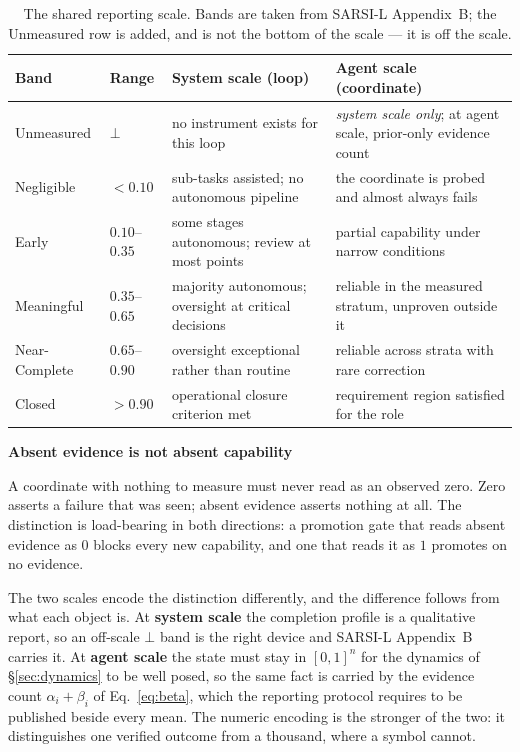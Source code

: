 \documentclass[11pt]{article}
\newenvironment{claimbox}[1]{%
  \begin{shaded}\noindent\textbf{#1}\par\smallskip}{%
  \end{shaded}}
\begin{document}
\begin{table}[t]
\centering\small
\caption{The shared reporting scale. Bands are taken from SARSI-L Appendix~B; the \textsf{Unmeasured} row is added, and is not the bottom of the scale --- it is off the scale.}
\label{tab:bands}
\begin{tabular}{p{2.6cm} p{1.8cm} p{5.4cm} p{5.0cm}}
\toprule
\textbf{Band} & \textbf{Range} & \textbf{System scale (loop)} & \textbf{Agent scale (coordinate)} \\
\midrule
\textsf{Unmeasured} & $\bot$ & no instrument exists for this loop & \emph{system scale only}; at agent scale, prior-only evidence count \\
Negligible & $<0.10$ & sub-tasks assisted; no autonomous pipeline & the coordinate is probed and almost always fails \\
Early & $0.10$--$0.35$ & some stages autonomous; review at most points & partial capability under narrow conditions \\
Meaningful & $0.35$--$0.65$ & majority autonomous; oversight at critical decisions & reliable in the measured stratum, unproven outside it \\
Near-Complete & $0.65$--$0.90$ & oversight exceptional rather than routine & reliable across strata with rare correction \\
Closed & $>0.90$ & operational closure criterion met & requirement region satisfied for the role \\
\bottomrule
\end{tabular}
\end{table}

\begin{claimbox}{Absent evidence is not absent capability}
A coordinate with nothing to measure must never read as an observed zero. Zero asserts a failure that was seen; absent evidence asserts nothing at all. The distinction is load-bearing in both directions: a promotion gate that reads absent evidence as $0$ blocks every new capability, and one that reads it as $1$ promotes on no evidence.

The two scales encode the distinction differently, and the difference follows from what each object is. At \textbf{system scale} the completion profile is a qualitative report, so an off-scale $\bot$ band is the right device and SARSI-L Appendix~B carries it. At \textbf{agent scale} the state must stay in $[0,1]^n$ for the dynamics of \S\ref{sec:dynamics} to be well posed, so the same fact is carried by the evidence count $\alpha_i+\beta_i$ of Eq.~\eqref{eq:beta}, which the reporting protocol requires to be published beside every mean. The numeric encoding is the stronger of the two: it distinguishes one verified outcome from a thousand, where a symbol cannot.
\end{claimbox}
\end{document}
